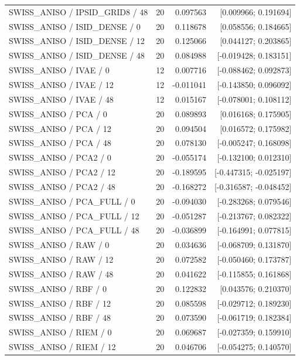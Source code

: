 \begin{longtable}{p{.56\linewidth}rrr}
SWISS\_ANISO / IPSID\_GRID8 / 48 & 20 & 0.097563 & [0.009966; 0.191694] \\
SWISS\_ANISO / ISID\_DENSE / 0 & 20 & 0.118678 & [0.058556; 0.184665] \\
SWISS\_ANISO / ISID\_DENSE / 12 & 20 & 0.125066 & [0.044127; 0.203865] \\
SWISS\_ANISO / ISID\_DENSE / 48 & 20 & 0.084988 & [-0.019428; 0.183151] \\
SWISS\_ANISO / IVAE / 0 & 12 & 0.007716 & [-0.088462; 0.092873] \\
SWISS\_ANISO / IVAE / 12 & 12 & -0.011041 & [-0.143850; 0.096092] \\
SWISS\_ANISO / IVAE / 48 & 12 & 0.015167 & [-0.078001; 0.108112] \\
SWISS\_ANISO / PCA / 0 & 20 & 0.089893 & [0.016168; 0.175905] \\
SWISS\_ANISO / PCA / 12 & 20 & 0.094504 & [0.016572; 0.175982] \\
SWISS\_ANISO / PCA / 48 & 20 & 0.078130 & [-0.005247; 0.168098] \\
SWISS\_ANISO / PCA2 / 0 & 20 & -0.055174 & [-0.132100; 0.012310] \\
SWISS\_ANISO / PCA2 / 12 & 20 & -0.189595 & [-0.447315; -0.025197] \\
SWISS\_ANISO / PCA2 / 48 & 20 & -0.168272 & [-0.316587; -0.048452] \\
SWISS\_ANISO / PCA\_FULL / 0 & 20 & -0.094030 & [-0.283268; 0.079546] \\
SWISS\_ANISO / PCA\_FULL / 12 & 20 & -0.051287 & [-0.213767; 0.082322] \\
SWISS\_ANISO / PCA\_FULL / 48 & 20 & -0.036899 & [-0.164991; 0.077815] \\
SWISS\_ANISO / RAW / 0 & 20 & 0.034636 & [-0.068709; 0.131870] \\
SWISS\_ANISO / RAW / 12 & 20 & 0.072582 & [-0.050460; 0.173787] \\
SWISS\_ANISO / RAW / 48 & 20 & 0.041622 & [-0.115855; 0.161868] \\
SWISS\_ANISO / RBF / 0 & 20 & 0.122832 & [0.043576; 0.210370] \\
SWISS\_ANISO / RBF / 12 & 20 & 0.085598 & [-0.029712; 0.189230] \\
SWISS\_ANISO / RBF / 48 & 20 & 0.073590 & [-0.061719; 0.182384] \\
SWISS\_ANISO / RIEM / 0 & 20 & 0.069687 & [-0.027359; 0.159910] \\
SWISS\_ANISO / RIEM / 12 & 20 & 0.046706 & [-0.054275; 0.140570] \\

\end{longtable}

